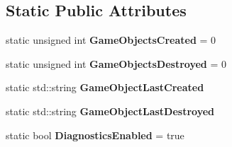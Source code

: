 \subsection*{Static Public Attributes}
\begin{DoxyCompactItemize}
\item 
\hypertarget{classDCEngine_1_1GameObject_a13b46ccfa313b8c5ce18617a1aa21731}{static unsigned int {\bfseries Game\-Objects\-Created} = 0}\label{classDCEngine_1_1GameObject_a13b46ccfa313b8c5ce18617a1aa21731}

\item 
\hypertarget{classDCEngine_1_1GameObject_a982dc1ac649f447dfa7fa3828f6864d2}{static unsigned int {\bfseries Game\-Objects\-Destroyed} = 0}\label{classDCEngine_1_1GameObject_a982dc1ac649f447dfa7fa3828f6864d2}

\item 
\hypertarget{classDCEngine_1_1GameObject_a0b53fcbb71e1dee22ff99fd177784f4a}{static std\-::string {\bfseries Game\-Object\-Last\-Created}}\label{classDCEngine_1_1GameObject_a0b53fcbb71e1dee22ff99fd177784f4a}

\item 
\hypertarget{classDCEngine_1_1GameObject_ac162481c14367cd07ebb104ec7136796}{static std\-::string {\bfseries Game\-Object\-Last\-Destroyed}}\label{classDCEngine_1_1GameObject_ac162481c14367cd07ebb104ec7136796}

\item 
\hypertarget{classDCEngine_1_1GameObject_a8901dd7e844e71bf9345ad0ed0489ba8}{static bool {\bfseries Diagnostics\-Enabled} = true}\label{classDCEngine_1_1GameObject_a8901dd7e844e71bf9345ad0ed0489ba8}

\end{DoxyCompactItemize}
